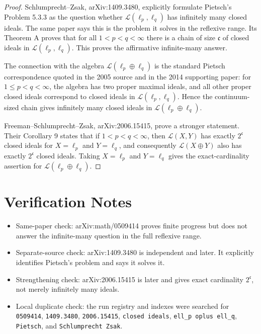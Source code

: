 \documentclass[11pt]{article}
\newcommand{\cL}{\mathcal L}
\begin{document}
\begin{proof}
Schlumprecht--Zsak, arXiv:1409.3480, explicitly formulate Pietsch's Problem
5.3.3 as the question whether \(\cL(\ell_p,\ell_q)\) has infinitely many
closed ideals.  The same paper says this is the problem it solves in the
reflexive range.  Its Theorem A proves that for all \(1<p<q<\infty\) there is
a chain of size \(\mathfrak c\) of closed ideals in
\(\cL(\ell_p,\ell_q)\).  This proves the affirmative infinite-many answer.

The connection with the algebra \(\cL(\ell_p\oplus\ell_q)\) is the standard
Pietsch correspondence quoted in the 2005 source and in the 2014 supporting
paper: for \(1\le p<q<\infty\), the algebra has two proper maximal ideals,
and all other proper closed ideals correspond to closed ideals in
\(\cL(\ell_p,\ell_q)\).  Hence the continuum-sized chain gives infinitely
many closed ideals in \(\cL(\ell_p\oplus\ell_q)\).

Freeman--Schlumprecht--Zsak, arXiv:2006.15415, prove a stronger statement.
Their Corollary 9 states that if \(1<p<q<\infty\), then
\(\cL(X,Y)\) has exactly \(2^{\mathfrak c}\) closed ideals for
\(X=\ell_p\) and \(Y=\ell_q\), and consequently
\(\cL(X\oplus Y)\) also has exactly \(2^{\mathfrak c}\) closed ideals.
Taking \(X=\ell_p\) and \(Y=\ell_q\) gives the exact-cardinality assertion for
\(\cL(\ell_p\oplus\ell_q)\).
\end{proof}

\section*{Verification Notes}

\begin{itemize}
  \item Same-paper check: arXiv:math/0509414 proves finite progress but does
  not answer the infinite-many question in the full reflexive range.
  \item Separate-source check: arXiv:1409.3480 is independent and later.  It
  explicitly identifies Pietsch's problem and says it solves it.
  \item Strengthening check: arXiv:2006.15415 is later and gives exact
  cardinality \(2^{\mathfrak c}\), not merely infinitely many ideals.
  \item Local duplicate check: the run registry and indexes were searched for
  \texttt{0509414}, \texttt{1409.3480}, \texttt{2006.15415},
  \texttt{closed ideals}, \texttt{ell\_p oplus ell\_q}, \texttt{Pietsch},
  and \texttt{Schlumprecht Zsak}.
\end{itemize}
\end{document}
